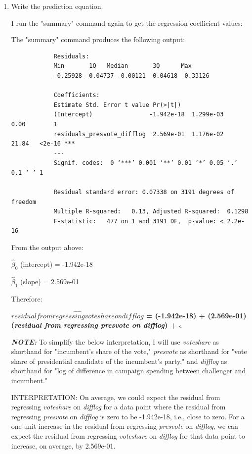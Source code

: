 \documentclass[12pt,letterpaper]{article}
\begin{document}
\begin{enumerate}
		\item Write the prediction equation.
		
		I run the "summary" command again to get the regression coefficient values:
			
		
		The "summary" command produces the following output:
			\begin{verbatim}
			Residuals:
			Min       1Q   Median       3Q      Max 
			-0.25928 -0.04737 -0.00121  0.04618  0.33126 
			
			Coefficients:
			Estimate Std. Error t value Pr(>|t|)    
			(Intercept)                -1.942e-18  1.299e-03    0.00        1    
			residuals_presvote_difflog  2.569e-01  1.176e-02   21.84   <2e-16 ***
			---
			Signif. codes:  0 ‘***’ 0.001 ‘**’ 0.01 ‘*’ 0.05 ‘.’ 0.1 ‘ ’ 1
			
			Residual standard error: 0.07338 on 3191 degrees of freedom
			Multiple R-squared:   0.13,	Adjusted R-squared:  0.1298 
			F-statistic:   477 on 1 and 3191 DF,  p-value: < 2.2e-16
		\end{verbatim}
		
		\vspace{2cm} From the output above:
		
		$\hat{\beta}_0$ (intercept) = -1.942e-18
		
		$\hat{\beta}_1$ (slope) = 2.569e-01
		
		\vspace{.5cm} Therefore:
		
			\vspace{0.5cm} \textbf{		$\hat{residual from regressing voteshare on difflog}$ = (-1.942e-18) + (2.569e-01)(\textit{residual from regressing presvote on difflog}) + $\epsilon$}
		
			\vspace{0.5cm} \textbf{\textit{NOTE:}} To simplify the below interpretation, I will use \textit{voteshare} as shorthand for "incumbent's share of the vote," \textit{presvote} as shorthand for "vote share of presidential candidate of the incumbent's party," and \textit{difflog} as shorthand for "log of difference in campaign spending between challenger and incumbent."
		
				\vspace{0.5cm} INTERPRETATION: On average, we could expect the residual from regressing \textit{voteshare} on \textit{difflog} for a data point where the residual from regressing \textit{presvote} on \textit{difflog} is zero to be -1.942e-18, i.e., close to zero. For a one-unit increase in the residual from regressing \textit{presvote} on \textit{difflog}, we can expect the residual from regressing \textit{voteshare} on \textit{difflog} for that data point to increase, on average, by 2.569e-01.
		
	\end{enumerate}
	
\end{document}
